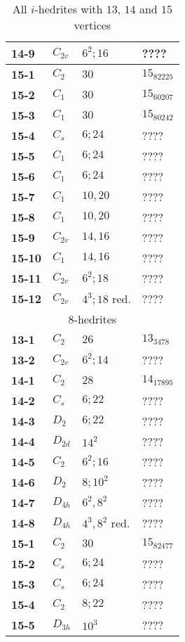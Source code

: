 \documentclass[12pt]{article}
\begin{document}
\begin{table}
\begin{center}
{\begin{minipage}[t]{7cm}
\begin{tabular}{||l|l|l|l||}
{\bf 14-9}      &$C_{2v}$       &$6^2; 16$      &????\\\hline
{\bf 15-1}      &$C_2$  &$30$   &$15_{82225}$\\
{\bf 15-2}      &$C_1$  &$30$   &$15_{60207}$\\
{\bf 15-3}      &$C_1$  &$30$   &$15_{80242}$\\
{\bf 15-4}      &$C_s$  &$6;24$ &????\\
{\bf 15-5}      &$C_1$  &$6;24$ &????\\
{\bf 15-6}      &$C_1$  &$6;24$ &????\\
{\bf 15-7}      &$C_1$  &$10,20$        &????\\
{\bf 15-8}      &$C_1$  &$10,20$        &????\\
{\bf 15-9}      &$C_{2v}$  &$14,16$ &????\\
{\bf 15-10}     &$C_1$  &$14,16$        &????\\
{\bf 15-11}     &$C_{2v}$       &$6^2; 18$      &????\\
{\bf 15-12}     &$C_{2v}$       &$4^3; 18$ red. &????\\\hline
\hline
\multicolumn{4}{||c||}{$8$-hedrites}\\\hline
{\bf 13-1}      &$C_2$  &$26$           &$13_{3478}$\\
{\bf 13-2}      &$C_{2v}$       &$6^2; 14$      &????\\\hline
{\bf 14-1}      &$C_2$  &$28$           &$14_{17895}$\\
{\bf 14-2}      &$C_s$  &$6; 22$                &????\\
{\bf 14-3}      &$D_2$  &$6; 22$                &????\\
{\bf 14-4}      &$D_{2d}$       &$14^2$         &????\\
{\bf 14-5}      &$C_2$  &$6^2; 16$      &????\\
{\bf 14-6}      &$D_2$  &$8; 10^2$      &????\\
{\bf 14-7}      &$D_{4h}$       &$6^2, 8^2$     &????\\
{\bf 14-8}      &$D_{4h}$       &$4^3, 8^2$ red.        &????\\\hline
{\bf 15-1}      &$C_2$  &$30$   &$15_{82477}$\\
{\bf 15-2}      &$C_s$  &$6; 24$        &????\\
{\bf 15-3}      &$C_s$  &$6;24$ &????\\
{\bf 15-4}      &$C_2$  &$8; 22$        &????\\
{\bf 15-5}      &$D_{3h}$       &$10^3$ &????\\\hline\hline
\end{tabular}
\end{minipage}
}
\end{center}
\caption{All $i$-hedrites with $13$, $14$ and $15$ vertices}
\label{tab:i-hedrite13_14}
\end{table}
\newpage
\end{document}
